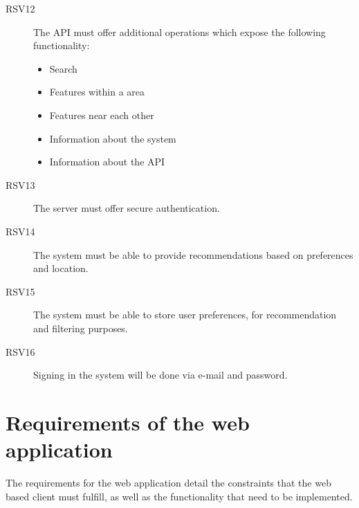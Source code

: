 \begin{description}
\item[RSV12] The API must offer additional operations which expose the following functionality:
  \begin{itemize}
  \item Search
  \item Features within a area
  \item Features near each other
  \item Information about the system
  \item Information about the API
  \end{itemize} 
\item[RSV13] The server must offer secure authentication.
\item[RSV14] The system must be able to provide recommendations based on preferences and location.
\item[RSV15] The system must be able to store user preferences, for recommendation and filtering purposes.
\item[RSV16] Signing in the system will be done via e-mail and password.
\end{description}

\section{Requirements of the web application}

The requirements for the web application detail the constraints that the web based client must fulfill, as well as the functionality that need to be implemented.

